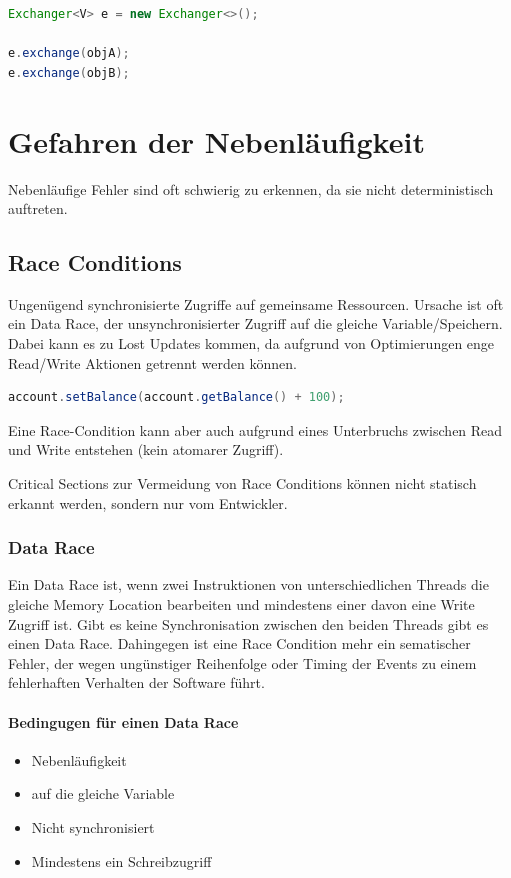 \begin{lstlisting}[language=java]
Exchanger<V> e = new Exchanger<>();

e.exchange(objA);
e.exchange(objB);
\end{lstlisting}


\section{Gefahren der Nebenläufigkeit}

Nebenläufige Fehler sind oft schwierig zu erkennen, da sie nicht deterministisch auftreten.

\subsection{Race Conditions}

Ungenügend synchronisierte Zugriffe auf gemeinsame Ressourcen. Ursache ist oft ein Data Race, der unsynchronisierter Zugriff auf die gleiche Variable/Speichern. Dabei kann es zu Lost Updates kommen, da aufgrund von Optimierungen enge Read/Write Aktionen getrennt werden können.

\begin{lstlisting}[language=java]
account.setBalance(account.getBalance() + 100);
\end{lstlisting}

Eine Race-Condition kann aber auch aufgrund eines Unterbruchs zwischen Read und Write entstehen (kein atomarer Zugriff).

Critical Sections zur Vermeidung von Race Conditions können nicht statisch erkannt werden, sondern nur vom Entwickler.

\subsubsection{Data Race}
Ein Data Race ist, wenn zwei Instruktionen von unterschiedlichen Threads die gleiche Memory Location bearbeiten und mindestens einer davon eine Write Zugriff ist. Gibt es keine Synchronisation zwischen den beiden Threads gibt es einen Data Race. Dahingegen ist eine Race Condition mehr ein sematischer Fehler, der wegen ungünstiger Reihenfolge oder Timing der Events zu einem fehlerhaften Verhalten der Software führt.

\paragraph{Bedingugen für einen Data Race}
\begin{itemize}
	\item Nebenläufigkeit
	\item auf die gleiche Variable
	\item Nicht synchronisiert
	\item Mindestens ein Schreibzugriff
\end{itemize}

